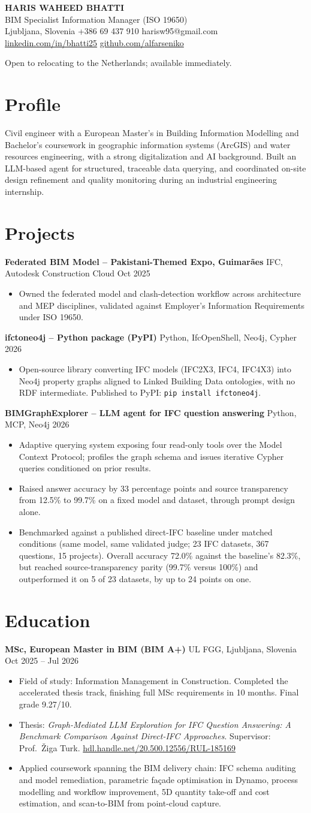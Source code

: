 \documentclass[a4paper,10.5pt]{article}
\newcommand{\datefill}{\dotfill}
\newcommand{\entry}[3]{\vspace{2.5pt}\noindent\textbf{#1} \textbar{} #2 \datefill{} #3\par\vspace{0.5pt}}
\newcommand{\ROLELINE}{BIM Specialist \textbar{} Information Manager (ISO 19650)}
\newcommand{\projIfcToNeo}{%
\entry{ifctoneo4j -- Python package (PyPI)}{Python, IfcOpenShell, Neo4j, Cypher}{2026}
\begin{itemize}
  \item Open-source library converting IFC models (IFC2X3, IFC4, IFC4X3) into Neo4j
        property graphs aligned to Linked Building Data ontologies, with no RDF
        intermediate. Published to PyPI: \texttt{pip install ifctoneo4j}.
\end{itemize}}
\newcommand{\projBIMGraph}{%
\entry{BIMGraphExplorer -- LLM agent for IFC question answering}{Python, MCP, Neo4j}{2026}
\begin{itemize}
  \item Adaptive querying system exposing four read-only tools over the Model
        Context Protocol; profiles the graph schema and issues iterative Cypher
        queries conditioned on prior results.
  \item Raised answer accuracy by 33 percentage points and source transparency from
        12.5\% to 99.7\% on a fixed model and dataset, through prompt design alone.
  \item Benchmarked against a published direct-IFC baseline under matched
        conditions (same model, same validated judge; 23 IFC datasets, 367
        questions, 15 projects). Overall accuracy 72.0\% against the baseline's
        82.3\%, but reached source-transparency parity (99.7\% versus 100\%) and
        outperformed it on 5 of 23 datasets, by up to 24 points on one.
\end{itemize}}
\newcommand{\projGuimaraes}{%
\entry{Federated BIM Model -- Pakistani-Themed Expo, Guimar\~aes}{IFC, Autodesk Construction Cloud}{Oct 2025}
\begin{itemize}
  \item Owned the federated model and clash-detection workflow across architecture
        and MEP disciplines, validated against Employer's Information Requirements
        under ISO 19650.
\end{itemize}}
\begin{document}
\begin{center}
  {\LARGE\bfseries HARIS WAHEED BHATTI}\\[2pt]
  {\large \ROLELINE}\\[3pt]
  Ljubljana, Slovenia \textbar{} +386 69 437 910 \textbar{} harisw95@gmail.com\\
  \href{https://linkedin.com/in/bhatti25}{linkedin.com/in/bhatti25} \textbar{}
  \href{https://github.com/alfarseniko}{github.com/alfarseniko}
\end{center}
\vspace{-4pt}
\noindent\small Open to relocating to the Netherlands; available immediately.\normalsize

\section{Profile}

\noindent Civil engineer with a European Master's in Building Information Modelling and
Bachelor's coursework in geographic information systems (ArcGIS) and water
resources engineering, with a strong digitalization and AI background. Built an
LLM-based agent for structured, traceable data querying, and coordinated on-site
design refinement and quality monitoring during an industrial engineering
internship.

\section{Projects}

 \projGuimaraes \projIfcToNeo \projBIMGraph

\section{Education}
\entry{MSc, European Master in BIM (BIM A+)}{UL FGG, Ljubljana, Slovenia}{Oct 2025 -- Jul 2026}
\begin{itemize}
  \item Field of study: Information Management in Construction. Completed the
        accelerated thesis track, finishing full MSc requirements in 10 months.
        Final grade 9.27/10.
  \item Thesis: \textit{Graph-Mediated LLM Exploration for IFC Question Answering:
        A Benchmark Comparison Against Direct-IFC Approaches}. Supervisor:
        Prof.~\v{Z}iga Turk. \href{http://hdl.handle.net/20.500.12556/RUL-185169}{hdl.handle.net/20.500.12556/RUL-185169}
  \item Applied coursework spanning the BIM delivery chain: IFC schema auditing and model remediation, parametric façade optimisation in Dynamo, process modelling and workflow improvement, 5D quantity take-off and cost estimation, and scan-to-BIM from point-cloud capture.
\end{itemize}
\end{document}
